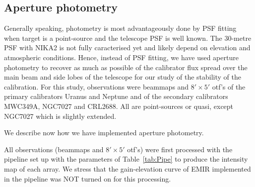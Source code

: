 
%



\subsection{Aperture photometry}
\label{S:ApPh}

Generally speaking, 
photometry is most advantageously done by PSF fitting when  target is a point-source and the telescope PSF is well known.
The 30-metre PSF with NIKA2 is not fully caracterised yet and likely depend on elevation and atmospheric conditions.
Hence, instead of PSF fitting, we have used aperture photometry to
recover as much as possible of the calibrator flux spread over the main beam and side
lobes of the telescope for our study of the stability of the calibration. 
For this study, observations were beammaps and $8' \times 5'$ otf's of the primary calibrators Uranus and Neptune
and of the secondary calibrators MWC349A, NGC7027 and CRL2688. All are
point-sources or quasi, except NGC7027 which is slightly extended.

We describe now how we have implemented aperture photometry.

All observations (beammaps and $8' \times 5'$ otf's) were first processed 
with the pipeline set up with the parameters of Table~\ref{tab:Pipe} to produce the intensity map of each array.
We stress that the  gain-elevation curve of EMIR implemented in the pipeline was NOT  turned on for this processing.

